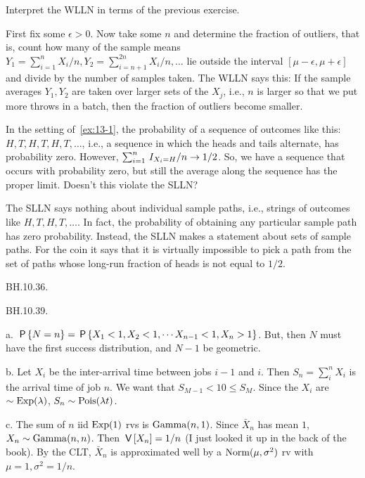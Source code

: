 \begin{exercise}
Interpret the WLLN in terms of the previous exercise.
\begin{solution}
  First fix some $\epsilon>0$.
  Now take some $n$ and determine the fraction of outliers, that is, count how many of the sample means $Y_{1}=\sum_{i=1}^{n} X_{i}/n, Y_{2}=\sum_{i=n+1}^{2n} X_{i}/n, \ldots$ lie outside the interval $[\mu-\epsilon, \mu + \epsilon]$ and divide by the number of samples taken.
  The WLLN says this: If the sample averages $Y_{1}, Y_{2}$ are taken over larger sets of the $X_{j}$, i.e., $n$ is larger so that we put more throws in a batch, then the fraction of outliers become smaller.
\end{solution}
\end{exercise}


\begin{exercise}
In the setting of~\cref{ex:13-1}, the probability of a sequence of outcomes like this: $H, T, H, T, H, T,\ldots$, i.e., a sequence in which the heads and tails alternate, has probability zero. However, $\sum_{i=1}^{n}\1{X_{i}=H}/n \to 1/2$. So, we have a sequence that occurs with probability zero, but still the average along the sequence has the proper limit. Doesn't this violate the SLLN?
\begin{solution}
The SLLN says nothing about individual sample paths, i.e.,  strings of outcomes like $H, T, H, T, \ldots$. In fact, the probability of obtaining any particular sample path has zero probability. Instead, the SLLN makes a statement about sets of sample paths. For the coin it says that it is virtually impossible to pick a path from the set of paths whose  long-run fraction of heads is not equal to $1/2$.
\end{solution}
\end{exercise}


\begin{exercise}
BH.10.36.
\end{exercise}


\begin{exercise}
BH.10.39.
\begin{solution}
a.
 $\P{N=n} = \P{X_1 < 1, X_2<1, \cdots X_{n-1}<1, X_n>1}$. But, then $N$ must have the  first success distribution, and $N-1$ be geometric.


b.
Let $X_i$ be the inter-arrival time between jobs $i-1$ and $i$. Then $S_n=\sum_i^n X_i$ is the arrival time of job $n$. We want that $S_{M-1} < 10 \leq S_M$. Since the $X_i$ are $\sim \Exp{\lambda}$, $S_n \sim \Pois{\lambda t}$.

c.  The sum of $n$ iid $\Exp{1}$ rvs is $\Gamm{n,1}$. Since $\bar X_{n}$ has mean $1$, $X_{n} \sim \Gamm{n,n}$. Then $\V{X_n} = 1/n$ (I just looked it up in the back of the book).  By the CLT, $\bar X_n$ is approximated well by a $\Norm{\mu, \sigma^{2}}$ rv with $\mu=1, \sigma^2=1/n$.

\end{solution}
\end{exercise}






